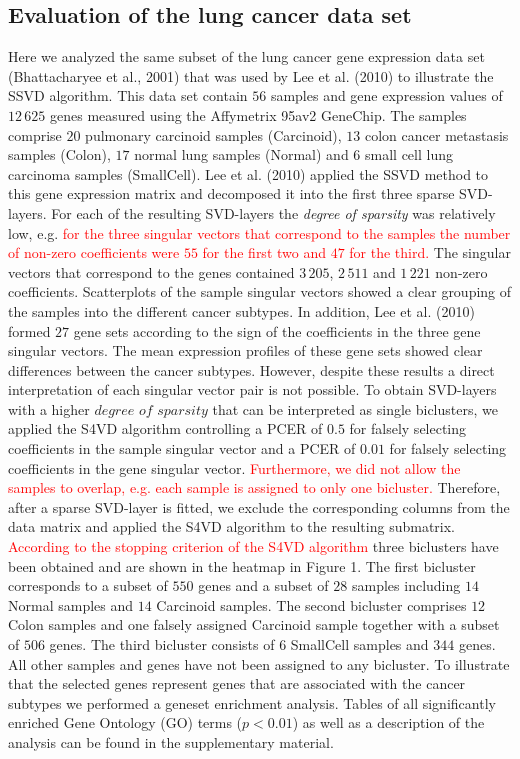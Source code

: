 \documentclass{bioinfo}
\begin{document}
\subsection{Evaluation of the lung cancer data set}
Here we analyzed the same subset of the lung cancer gene expression data set (Bhattacharyee et al., 2001) that was used by Lee et al. (2010) to illustrate the SSVD algorithm. This data set contain $56$ samples and gene expression values of $12\,625$ genes measured using the Affymetrix 95av2 GeneChip. The samples comprise $20$ pulmonary carcinoid samples (Carcinoid), $13$ colon cancer metastasis samples (Colon), $17$ normal lung samples (Normal) and $6$ small cell lung carcinoma samples (SmallCell). Lee et al. (2010) applied the SSVD method to this gene expression matrix and decomposed it into the first three sparse SVD-layers. For each of the resulting SVD-layers the \textit{degree of sparsity} was relatively low, e.g. \textcolor{red}{for the three singular vectors that correspond to the samples the number of non-zero coefficients were $55$ for the first two and $47$ for the third.} The singular vectors that correspond to the genes contained $3\,205$, $2\,511$ and $1\,221$ non-zero coefficients. Scatterplots of the sample singular vectors showed a clear grouping of the samples into the different cancer subtypes. In addition, Lee et al. (2010) formed $27$ gene sets according to the sign of the coefficients in the three gene singular vectors. The mean expression profiles of these gene sets showed clear differences between the cancer subtypes. However, despite these results a direct interpretation of each singular vector pair is not possible. 
To obtain SVD-layers with a higher $\textit{degree of sparsity}$ that can be interpreted as single biclusters, we applied the S4VD algorithm controlling a PCER of $0.5$ for falsely selecting coefficients in the sample singular vector and a PCER of $0.01$ for falsely selecting coefficients in the gene singular vector. \textcolor{red}{Furthermore, we did not allow the samples to overlap, e.g. each sample is assigned to only one bicluster.} Therefore, after a sparse SVD-layer is fitted, we exclude the corresponding columns from the data matrix and applied the S4VD algorithm to the resulting submatrix. \textcolor{red}{According to the stopping criterion of the S4VD algorithm} three biclusters have been obtained and are shown in the heatmap in Figure 1. The first bicluster corresponds to a subset of $550$ genes and a subset of $28$ samples including $14$ Normal samples and $14$ Carcinoid samples. The second bicluster comprises $12$ Colon samples and one falsely assigned Carcinoid sample together with a subset of $506$ genes. The third bicluster consists of $6$ SmallCell samples and $344$ genes. All other samples and genes have not been assigned to any bicluster. To illustrate that the selected genes represent genes that are associated with the cancer subtypes we performed a geneset enrichment analysis. Tables of all significantly enriched Gene Ontology (GO) terms ($p<0.01$) as well as a description of the analysis can be found in the supplementary material. 
\end{document}
